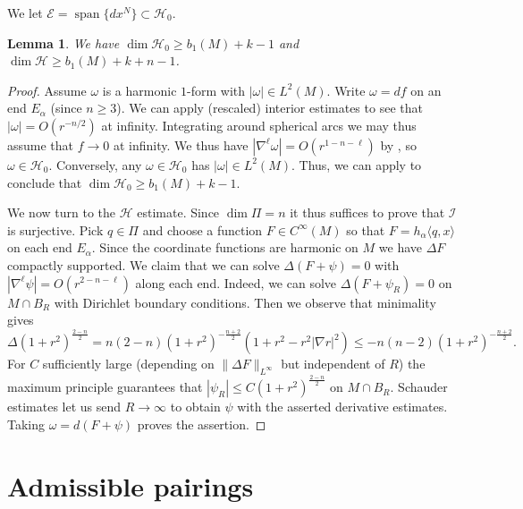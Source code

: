 \documentclass[11pt]{amsart}
\numberwithin{equation}{section}
\theoremstyle{plain}
\newtheorem{lemma}[lemma]{Lemma}
\theoremstyle{definition}
\theoremstyle{remark}
\newcommand{\Hcal}{\mathcal H}
\newcommand{\Hzero}{\mathcal H_0}
\newcommand{\Ecal}{\mathcal E}
\newcommand{\Ical}{\mathcal I}
\DeclareMathOperator{\Span}{span}
\newcommand{\bangle}[1]{\langle #1 \rangle}
\begin{document}
We let $\Ecal = \Span \{ dx^N\} \subset \Hzero$. 
\begin{lemma}\label{lemm:harm-forms}
We have $\dim \Hzero \geq b_1(M) + k-1$ and $\dim \Hcal  \geq b_1(M) + k + n-1$. 
\end{lemma}
\begin{proof}
Assume $\omega$ is a harmonic $1$-form with $|\omega| \in L^2(M)$. Write $\omega = df$ on an end $E_\alpha$ (since $n\geq 3$). We can apply (rescaled) interior estimates to see that $|\omega| = O(r^{-n/2})$ at infinity. Integrating around spherical arcs we may thus assume that $f\to 0$ at infinity. We thus have $|\nabla^\ell \omega| = O(r^{1-n-\ell})$ by , so $\omega \in \Hcal_0$. Conversely, any $\omega \in \Hcal_0$ has $|\omega| \in L^2(M)$. Thus, we can apply \cite[Proposition 4.1]{Li2017} to conclude that $\dim \Hzero \geq b_1(M) + k-1$. 

We now turn to the $\Hcal$ estimate. Since $\dim \Pi = n$ it thus suffices to prove that $\Ical$ is surjective. Pick $q \in \Pi$ and choose a function $F \in C^\infty(M)$ so that $F= h_\alpha \bangle{q,x}$ on each end $E_\alpha$. Since the coordinate functions are harmonic on $M$ we have $\Delta F$ compactly supported. We claim that we can solve $\Delta(F+\psi) = 0$ with $|\nabla^\ell \psi| = O(r^{2-n-\ell})$ along each end. Indeed, we can solve $\Delta(F+\psi_R) = 0$ on $M\cap B_R$ with Dirichlet boundary conditions. Then we observe that minimality gives
\[
\Delta (1+r^2)^{\frac{2-n}{2}} = n(2-n) (1+r^2)^{-\frac {n+2}{2}}(1+r^2 - r^2 |\nabla r|^2) \leq -n(n-2) (1+r^2)^{-\frac{n+2}{2}}  .
\]
For $C$ sufficiently large (depending on $\|\Delta F\|_{L^\infty}$ but independent of $R$) the maximum principle guarantees that $|\psi_R|   \leq C (1+r^2)^{\frac{2-n}{2}}$ on $M\cap B_R$. Schauder estimates let us send $R\to\infty$ to obtain $\psi$ with the asserted derivative estimates. Taking $\omega = d(F+\psi)$ proves the assertion. 
\end{proof}




\section{Admissible pairings}\label{sec:admissible}
\end{document}
